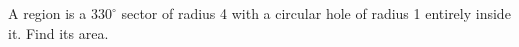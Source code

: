 A region is a $ 330^\circ $ sector of radius 4 with a circular hole of radius 1 entirely inside it. Find its area.

